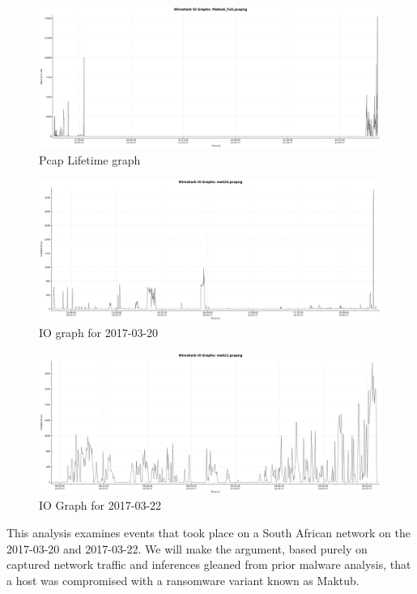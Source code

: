 \documentclass[11pt]{diazessay} %
\begin{document}
\begin{figure}[H]
        \centering
        \includegraphics[scale=0.28]{Maktub_Full.png}
    \caption{Pcap Lifetime graph}
\end{figure}

\begin{figure}[H]
        \centering
        \includegraphics[scale=0.28]{mak20.png}
    \caption{IO graph for 2017-03-20} 
\end{figure}

\begin{figure}[H]
        \centering
        \includegraphics[scale=0.28]{mak22.png}
    \caption{IO Graph for 2017-03-22}
\end{figure}

This analysis examines events that took place on a South African network on the 2017-03-20 and 2017-03-22. We will make the argument, based purely on captured network traffic and inferences gleaned from prior malware analysis, that a host was compromised with a ransomware variant known as Maktub. 
\end{document}
